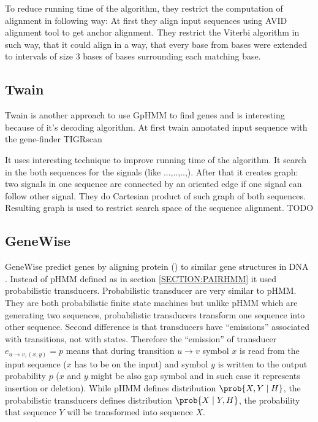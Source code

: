 To reduce running time of the algorithm, they restrict the computation of
alignment in following way: At first they  align input sequences using AVID
alignment tool\cite{Bray2003} to get anchor alignment. They restrict the Viterbi
algorithm in such way, that it could align  in a way, that every base from
bases were extended to intervals of size $3$ bases of bases surrounding each
matching base.



\subsection{Twain}

Twain is another approach to use GpHMM to find genes \cite{Majoros2005}
and is interesting because of it's decoding algorithm. At first 
twain annotated input sequence with the gene-finder TIGRscan

It uses interesting technique to improve
running time of the algorithm. It search in the both sequences for the signals
(like ...,..,..,). After that it creates graph: two signals in one sequence are
connected by an oriented edge if one signal can follow other signal. They do
Cartesian product of such graph of both sequences. Resulting graph is used to
restrict search space of the sequence alignment.
TODO


\subsection{GeneWise}

GeneWise predict genes by aligning protein () to similar gene structures in DNA
\cite{GeneWise2004}. Instead of pHMM defined as in section \ref{SECTION:PAIRHMM}
it used probabilistic transducers. Probabilistic transducer are very similar to
pHMM. They are both probabilistic finite state machines but unlike pHMM which
are generating two sequences, probabilistic transducers transform one sequence
into other sequence.  Second difference is that transducers have ``emissions''
associated with transitions, not with states.  Therefore the ``emission'' of
transducer $e_{u\to v,(x,y)}=p$ means that during transition $u\to v$ symbol $x$
is read from the input sequence ($x$ has to be on the input) and symbol $y$ is
written to the output probability $p$ ($x$ and $y$ might be also gap symbol and
in such case it represents insertion or deletion).  While pHMM defines
distribution $\prob{X,Y\mid H}$, the probabilistic transducers defines
distribution $\prob{X\mid Y,H}$, the probability that sequence $Y$ will be
transformed into sequence $X$.

